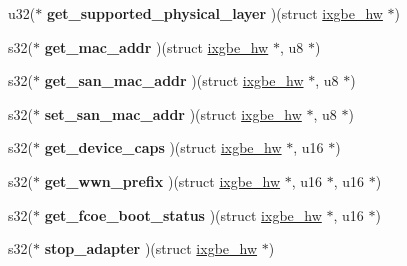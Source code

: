 \begin{DoxyCompactItemize}
\item 
\hypertarget{structixgbe__mac__operations_a6c505fd7b33070bb5763119c02f8b77b}{
u32($\ast$ {\bfseries get\_\-supported\_\-physical\_\-layer} )(struct \hyperlink{structixgbe__hw}{ixgbe\_\-hw} $\ast$)}
\label{structixgbe__mac__operations_a6c505fd7b33070bb5763119c02f8b77b}

\item 
\hypertarget{structixgbe__mac__operations_a4f0937f3ac957f82418b1d4735429432}{
s32($\ast$ {\bfseries get\_\-mac\_\-addr} )(struct \hyperlink{structixgbe__hw}{ixgbe\_\-hw} $\ast$, u8 $\ast$)}
\label{structixgbe__mac__operations_a4f0937f3ac957f82418b1d4735429432}

\item 
\hypertarget{structixgbe__mac__operations_a8d0612d8b31944bcd7bc7d53f3c437b8}{
s32($\ast$ {\bfseries get\_\-san\_\-mac\_\-addr} )(struct \hyperlink{structixgbe__hw}{ixgbe\_\-hw} $\ast$, u8 $\ast$)}
\label{structixgbe__mac__operations_a8d0612d8b31944bcd7bc7d53f3c437b8}

\item 
\hypertarget{structixgbe__mac__operations_a03d79d4302145199f7606e7fabe8925b}{
s32($\ast$ {\bfseries set\_\-san\_\-mac\_\-addr} )(struct \hyperlink{structixgbe__hw}{ixgbe\_\-hw} $\ast$, u8 $\ast$)}
\label{structixgbe__mac__operations_a03d79d4302145199f7606e7fabe8925b}

\item 
\hypertarget{structixgbe__mac__operations_a4b036e1e9a5db38388992776a83e1862}{
s32($\ast$ {\bfseries get\_\-device\_\-caps} )(struct \hyperlink{structixgbe__hw}{ixgbe\_\-hw} $\ast$, u16 $\ast$)}
\label{structixgbe__mac__operations_a4b036e1e9a5db38388992776a83e1862}

\item 
\hypertarget{structixgbe__mac__operations_ac1ad27d12f244fe8c50c7b979052aa7c}{
s32($\ast$ {\bfseries get\_\-wwn\_\-prefix} )(struct \hyperlink{structixgbe__hw}{ixgbe\_\-hw} $\ast$, u16 $\ast$, u16 $\ast$)}
\label{structixgbe__mac__operations_ac1ad27d12f244fe8c50c7b979052aa7c}

\item 
\hypertarget{structixgbe__mac__operations_aefe1288efaabbaea70275fb91dc29ef6}{
s32($\ast$ {\bfseries get\_\-fcoe\_\-boot\_\-status} )(struct \hyperlink{structixgbe__hw}{ixgbe\_\-hw} $\ast$, u16 $\ast$)}
\label{structixgbe__mac__operations_aefe1288efaabbaea70275fb91dc29ef6}

\item 
\hypertarget{structixgbe__mac__operations_ad00e397d5b3e7fdd7592322f8539a7cb}{
s32($\ast$ {\bfseries stop\_\-adapter} )(struct \hyperlink{structixgbe__hw}{ixgbe\_\-hw} $\ast$)}
\label{structixgbe__mac__operations_ad00e397d5b3e7fdd7592322f8539a7cb}


\end{DoxyCompactItemize}
